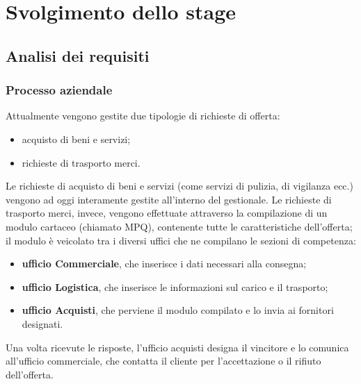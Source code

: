 
\chapter{Svolgimento dello stage}
\label{cap:svolgimento-dello-stage}




\section{Analisi dei requisiti}

\subsection{Processo aziendale}

Attualmente vengono gestite due tipologie di richieste di offerta:
\begin{itemize}
	\item acquisto di beni e servizi;
	\item richieste di trasporto merci.
\end{itemize}
Le richieste di acquisto di beni e servizi (come servizi di pulizia, di vigilanza ecc.) vengono ad oggi interamente gestite all'interno del gestionale. 
Le richieste di trasporto merci, invece, vengono effettuate attraverso la compilazione di un modulo cartaceo (chiamato MPQ), contenente tutte le caratteristiche dell'offerta; il modulo è veicolato tra i diversi uffici che ne compilano le sezioni di competenza:
\begin{itemize}
	\item \textbf{ufficio Commerciale}, che inserisce i dati necessari alla consegna;
	\item \textbf{ufficio Logistica}, che inserisce le informazioni sul carico e il trasporto;
	\item \textbf{ufficio Acquisti}, che perviene il modulo compilato e lo invia ai fornitori designati.
\end{itemize}
Una volta ricevute le risposte, l'ufficio acquisti designa il vincitore e lo comunica all'ufficio commerciale, che contatta il cliente per l'accettazione o il rifiuto dell'offerta.


